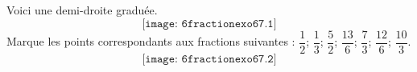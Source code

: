 Voici une demi-droite graduée.
\[\texttt{[image: 6fractionexo67.1]}\]
Marque les points correspondants aux fractions suivantes : $\dfrac12$; $\dfrac13$; $\dfrac52$; $\dfrac{13}6$; $\dfrac73$; $\dfrac{12}6$; $\dfrac{10}3$.
\[\texttt{[image: 6fractionexo67.2]}\]